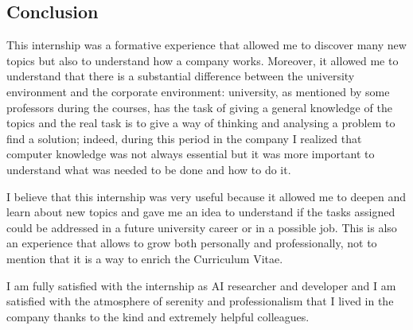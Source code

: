 \documentclass[14pt]{extarticle}
\def\sp{\vspace{5pt}}
\def\ss{\vspace{25pt}}
\def\ppn{\vspace{10pt}}
\begin{document}
\newpage
\begin{center}
	\section{Conclusion}
	\sp
\end{center}
\begin{flushleft}

This internship was a formative experience that allowed me to discover many new topics but also to understand how a company works. Moreover, it allowed me to understand that there is a substantial difference between the university environment and the corporate environment: university, as mentioned by some professors during the courses, has the task of giving a general knowledge of the topics and the real task is to give a way of thinking and analysing a problem to find a solution; indeed, during this period in the company I realized that computer knowledge was not always essential but it was more important to understand what was needed to be done and how to do it.
\ppn

I believe that this internship was very useful because it allowed me to deepen and learn about new topics and gave me an idea to understand if the tasks assigned could be addressed in a future university career or in a possible job.
\newline
This is also an experience that allows to grow both personally and professionally, not to mention that it is a way to
enrich the Curriculum Vitae.

\ppn
I am fully satisfied with the internship as AI researcher and developer and I am satisfied with the atmosphere of serenity and professionalism that I lived in the company thanks to the kind and extremely helpful colleagues.
	\ss
\end{flushleft}

\newpage
\end{document}

